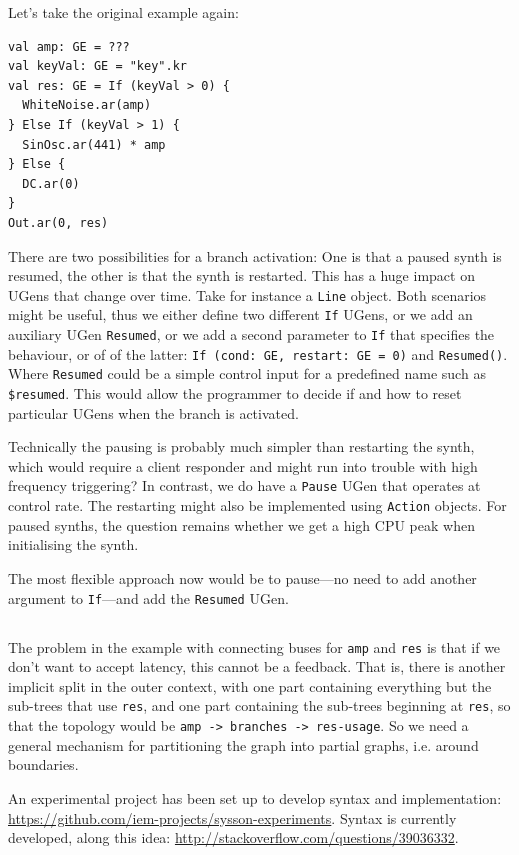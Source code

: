 \documentclass[11pt,a4paper]{article}
\begin{document}
Let's take the original example again:
%
\begin{verbatim}
val amp: GE = ???
val keyVal: GE = "key".kr
val res: GE = If (keyVal > 0) {
  WhiteNoise.ar(amp)
} Else If (keyVal > 1) {
  SinOsc.ar(441) * amp
} Else {
  DC.ar(0)
}
Out.ar(0, res)
\end{verbatim}
%
There are two possibilities for a branch activation: One is that a paused synth is resumed, the other is that the synth is restarted. This has a huge impact on UGens that change over time. Take for instance a \verb!Line! object. Both scenarios might be useful, thus we either define two different \verb!If! UGens, or we add an auxiliary UGen \verb!Resumed!, or we add a second parameter to \verb!If! that specifies the behaviour, or of of the latter: \verb!If (cond: GE, restart: GE = 0)! and \verb!Resumed()!. Where \verb!Resumed! could be a simple control input for a predefined name such as \verb!$resumed!. This would allow the programmer to decide if and how to reset particular UGens when the branch is activated.

Technically the pausing is probably much simpler than restarting the synth, which would require a client responder and might run into trouble with high frequency triggering? In contrast, we do have a \verb!Pause! UGen that operates at control rate. The restarting might also be implemented using \verb!Action! objects. For paused synths, the question remains whether we get a high CPU peak when initialising the synth.

The most flexible approach now would be to pause---no need to add another argument to \verb!If!---and add the \verb!Resumed! UGen.

\subsection*{\centering *}

The problem in the example with connecting buses for \verb!amp! and \verb!res! is that if we don't want to accept latency, this cannot be a feedback. That is, there is another implicit split in the outer context, with one part containing everything but the sub-trees that use \verb!res!, and one part containing the sub-trees beginning at \verb!res!, so that the topology would be \verb!amp -> branches -> res-usage!. So we need a general mechanism for partitioning the graph into partial graphs, i.e. around boundaries.

An experimental project has been set up to develop syntax and implementation: \url{https://github.com/iem-projects/sysson-experiments}. Syntax is currently developed, along this idea: \url{http://stackoverflow.com/questions/39036332}.
\end{document}
